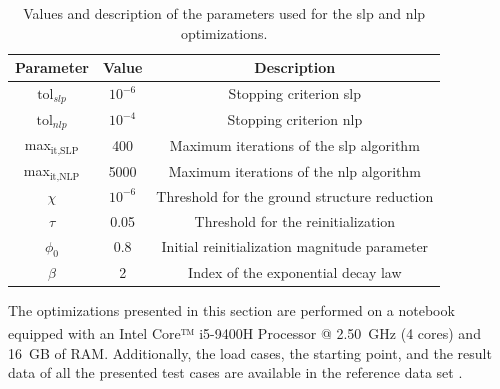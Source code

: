 \begin{table}
    \small
\centering
\begin{tabular}{ccc}
\toprule
\textbf{Parameter} & \textbf{Value} & \textbf{Description}    \\ \midrule
$\text{tol}_{slp}$             & $10^{-6}$           & Stopping criterion \gls{slp}                       \\
$\text{tol}_{nlp}$               & $10^{-4}$           & Stopping criterion \gls{nlp}                        \\
max$_{\text{it,SLP}}$        & 400            & Maximum iterations of the \gls{slp} algorithm                       \\
max$_{\text{it,NLP}}$         & 5000           & Maximum iterations of the \gls{nlp} algorithm                        \\
$\chi$                & $10^{-6}$           & Threshold for the ground structure reduction                        \\
$\tau$                & 0.05           & Threshold for the reinitialization                        \\
$\phi_0$              & 0.8            & Initial reinitialization magnitude parameter                         \\
$\beta$             & 2              & Index of the exponential decay law \\
\bottomrule
\end{tabular}
\caption{Values and description of the parameters used for the \gls{slp} and \gls{nlp} optimizations.}
\label{tab:04_param}
\end{table}

The optimizations presented in this section are performed on a notebook equipped with an Intel\textsuperscript{\textregistered} Core™ i5-9400H Processor @ \qty{2.50}{GHz} (4 cores) and \qty{16}{GB} of RAM. Additionally, the load cases, the starting point, and the result data of all the presented test cases are available in the reference data set .

